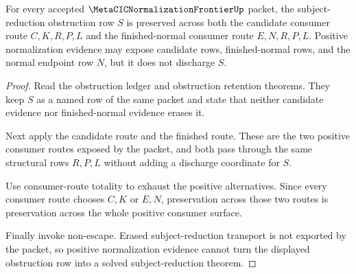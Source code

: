 \begin{theorem}
\label{thm:metacic-normalization-frontier-subject-obstruction-preservation}
For every accepted $\MetaCICNormalizationFrontierUp$ packet, the
subject-reduction obstruction row $S$ is preserved across both the candidate
consumer route $C,K,R,P,L$ and the finished-normal consumer route $E,N,R,P,L$.
Positive normalization evidence may expose candidate rows, finished-normal
rows, and the normal endpoint row $N$, but it does not discharge $S$.
\end{theorem}
\begin{proof}
Read the obstruction ledger and obstruction retention theorems. They keep $S$
as a named row of the same packet and state that neither candidate evidence nor
finished-normal evidence erases it.

Next apply the candidate route and the finished route. These are the two
positive consumer routes exposed by the packet, and both pass through the same
structural rows $R,P,L$ without adding a discharge coordinate for $S$.

Use consumer-route totality to exhaust the positive alternatives. Since every
consumer route chooses $C,K$ or $E,N$, preservation across those two routes is
preservation across the whole positive consumer surface.

Finally invoke non-escape. Erased subject-reduction transport is not exported
by the packet, so positive normalization evidence cannot turn the displayed
obstruction row into a solved subject-reduction theorem.
\end{proof}

